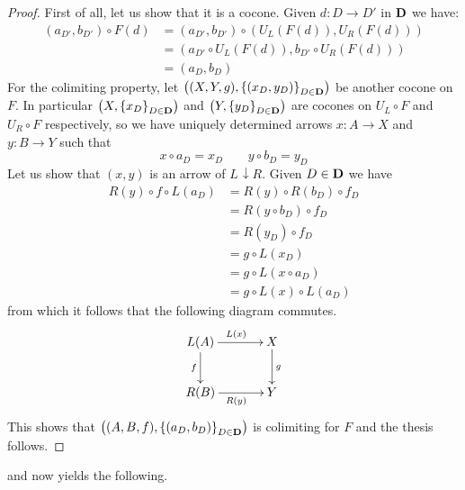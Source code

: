 \documentclass[a4paper,UKenglish,cleveref,pdftex,thm-restate,numberwithinsect]{lipics-v2021}
\def\D{\textbf {\textup{D}}}
\newcommand{\comma}[2]{#1\hspace{1pt} {\downarrow}#2}
\begin{document}
\begin{proof}
	First of all, let us show that it is a cocone. Given $d\colon D\to D'$ in $\D$ we have:
	\begin{align*}
		\left(a_{D'}, b_{D'}\right)\circ F(d)&=	\left(a_{D'}, b_{D'}\right)\circ \left(U_L(F(d)), U_R(F(d))\right)\\&=\left( a_{D'}\circ U_L(F(d)),  b_{D'}\circ U_R(F(d)) \right)\\&=\left(a_D, b_D\right)
	\end{align*}
	For the colimiting property, let $\left((X, Y, g), \left\{\left(x_D, y_D\right)\right\}_{D\in \D}\right)$ be another cocone on $F$. In particular $\left(X, \left\{x_D\right\}_{D\in \D}\right)$ and $\left(Y, \left\{y_D\right\}_{D\in \D}\right)$ are cocones on $U_L\circ F$ and $U_R\circ F$ respectively, so we have uniquely determined arrows $x\colon A\rightarrow X$ and $y\colon B\rightarrow Y$ such that 
	\[x\circ a_D= x_D \qquad y\circ b_D= y_D\]
	Let us show that $(x,y)$ is an arrow of $\comma{L}{R}$. Given $D\in \D$ we have
	\begin{align*}
		R(y)\circ f\circ L(a_D)&=R(y)\circ R\left(b_D\right)\circ f_D\\&=R\left(y\circ b_D\right)\circ f_D\\&=R\left(y_D\right)\circ f_D\\&= g\circ L\left(x_D\right)\\&=g\circ L\left(x\circ a_D\right)\\&=g\circ L(x)\circ L\left(a_D\right)
	\end{align*}
	from which it follows  that the following diagram commutes.
	\[\xymatrix@C=35pt{L(A)\ar[d]_{f} \ar[r]^{L(x)} & X \ar[d]^{g}\\ R(B) \ar[r]_{R(y)}& Y}\]
	This shows that $\left((A, B, f), \left\{(a_D, b_D)\right\}_{D\in \D}\right)$ is colimiting for $F$ and the thesis follows.    
\end{proof} 


 and  now yields the following.
\end{document}
